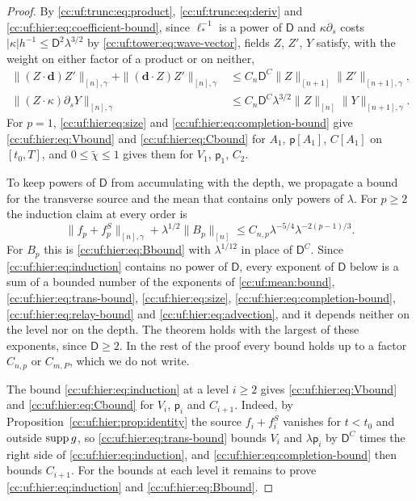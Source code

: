 \begin{proof}
By \eqref{cc:uf:trunc:eq:product}, \eqref{cc:uf:trunc:eq:deriv} and
\eqref{cc:uf:hier:eq:coefficient-bound}, since $\ell_*^{-1}$ is a power
of $\mathsf D$ and $\kappa\partial_s$ costs
$|\kappa|h^{-1}\le\mathsf D^2\lambda^{3/2}$ by
\eqref{cc:uf:tower:eq:wave-vector}, fields $Z$, $Z'$, $Y$
satisfy, with the weight on either factor of a product or on neither,
\begin{equation}\label{cc:uf:hier:eq:advection}
 \begin{aligned}
 \|(Z\cdot\mathbf d)Z'\|_{[n],\gamma}+\|(\mathbf d\cdot Z)Z'\|_{[n],\gamma}
 &\le C_n\mathsf D^C\|Z\|_{[n+1]}\|Z'\|_{[n+1],\gamma},\\
 \|(Z\cdot\kappa)\partial_sY\|_{[n],\gamma}
 &\le C_n\mathsf D^C\lambda^{3/2}\|Z\|_{[n]}\|Y\|_{[n+1],\gamma}.
 \end{aligned}
\end{equation}
For $p=1$, \eqref{cc:uf:hier:eq:size} and
\eqref{cc:uf:hier:eq:completion-bound} give
\eqref{cc:uf:hier:eq:Vbound} and \eqref{cc:uf:hier:eq:Cbound} for
$A_1$, $\mathsf p[A_1]$, $C[A_1]$ on $[t_0,T]$, and
$0\le\widetilde\chi\le1$ gives them for $V_1$, $\mathsf p_1$, $C_2$.

To keep powers of $\mathsf D$ from accumulating with the depth, we
propagate a bound for the transverse source and the mean that contains
only powers of $\lambda$. For $p\ge2$ the induction claim at every order is
\begin{equation}\label{cc:uf:hier:eq:induction}
 \|f_p+f_p^S\|_{[n],\gamma}+\lambda^{1/2}\|B_p\|_{[n]}
 \le C_{n,p}\lambda^{-5/4}\lambda^{-2(p-1)/3}.
\end{equation}
For $B_p$ this is \eqref{cc:uf:hier:eq:Bbound} with $\lambda^{1/12}$ in
place of $\mathsf D^C$. Since \eqref{cc:uf:hier:eq:induction} contains
no power of $\mathsf D$, every exponent of $\mathsf D$ below is a sum
of a bounded number of the exponents of \eqref{cc:uf:mean:bound},
\eqref{cc:uf:hier:eq:trans-bound}, \eqref{cc:uf:hier:eq:size},
\eqref{cc:uf:hier:eq:completion-bound},
\eqref{cc:uf:hier:eq:relay-bound} and \eqref{cc:uf:hier:eq:advection},
and it depends neither on the level nor on the depth. The theorem holds
with the largest of these exponents, since $\mathsf D\ge2$. In the rest
of the proof every bound holds up to a factor $C_{n,p}$ or $C_{m,P}$,
which we do not write.

The bound \eqref{cc:uf:hier:eq:induction} at a level $i\ge2$ gives
\eqref{cc:uf:hier:eq:Vbound} and \eqref{cc:uf:hier:eq:Cbound} for $V_i$,
$\mathsf p_i$ and $C_{i+1}$. Indeed, by Proposition~\ref{cc:uf:hier:prop:identity} the source
$f_i+f_i^S$ vanishes for $t<t_0$ and outside $\operatorname{supp} g$, so
\eqref{cc:uf:hier:eq:trans-bound} bounds $V_i$ and $\lambda\mathsf p_i$
by $\mathsf D^C$ times the right side of
\eqref{cc:uf:hier:eq:induction}, and
\eqref{cc:uf:hier:eq:completion-bound} then bounds $C_{i+1}$. For the bounds
at each level it remains to prove \eqref{cc:uf:hier:eq:induction} and
\eqref{cc:uf:hier:eq:Bbound}.


\end{proof}

